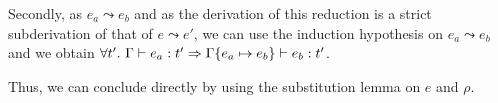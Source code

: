 \documentclass[a4paper]{article}
\theoremstyle{definition}
\begin{document}
\begin{description}
\begin{itemize}
            Secondly, as $e_a\leadsto e_b$ and as the derivation of this reduction is a strict subderivation of that of $e\leadsto e'$,
            we can use the induction hypothesis on $e_a\leadsto e_b$ and we obtain $\forall t'.\ \Gamma \vdash e_a : t' \Rightarrow \Gamma\{e_a \mapsto e_b\} \vdash e_b:t'$.
            
            Thus, we can conclude directly by using the substitution lemma on $e$ and $\rho$.
          \end{itemize}
        \end{description}
\end{document}

